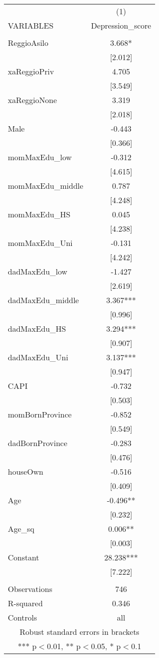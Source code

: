 \documentclass[]{article}
\begin{document}
\begin{tabular}{lc} \hline
 & (1) \\
VARIABLES & Depression\_score \\ \hline
 &  \\
ReggioAsilo & 3.668* \\
 & [2.012] \\
xaReggioPriv & 4.705 \\
 & [3.549] \\
xaReggioNone & 3.319 \\
 & [2.018] \\
Male & -0.443 \\
 & [0.366] \\
momMaxEdu\_low & -0.312 \\
 & [4.615] \\
momMaxEdu\_middle & 0.787 \\
 & [4.248] \\
momMaxEdu\_HS & 0.045 \\
 & [4.238] \\
momMaxEdu\_Uni & -0.131 \\
 & [4.242] \\
dadMaxEdu\_low & -1.427 \\
 & [2.619] \\
dadMaxEdu\_middle & 3.367*** \\
 & [0.996] \\
dadMaxEdu\_HS & 3.294*** \\
 & [0.907] \\
dadMaxEdu\_Uni & 3.137*** \\
 & [0.947] \\
CAPI & -0.732 \\
 & [0.503] \\
momBornProvince & -0.852 \\
 & [0.549] \\
dadBornProvince & -0.283 \\
 & [0.476] \\
houseOwn & -0.516 \\
 & [0.409] \\
Age & -0.496** \\
 & [0.232] \\
Age\_sq & 0.006** \\
 & [0.003] \\
Constant & 28.238*** \\
 & [7.222] \\
 &  \\
Observations & 746 \\
R-squared & 0.346 \\
 Controls & all \\ \hline
\multicolumn{2}{c}{ Robust standard errors in brackets} \\
\multicolumn{2}{c}{ *** p$<$0.01, ** p$<$0.05, * p$<$0.1} \\
\end{tabular}
\end{document}
